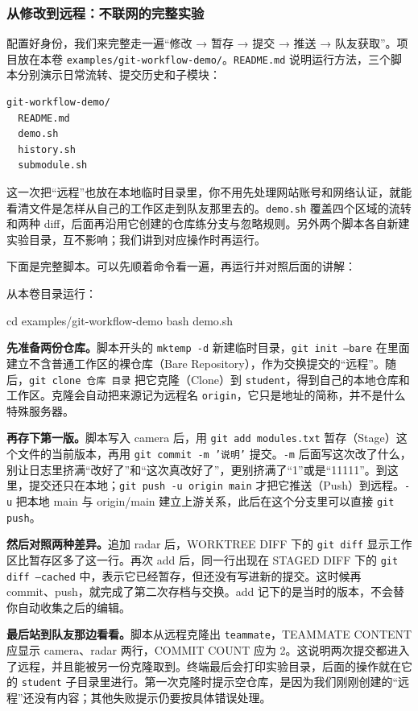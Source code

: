 \subsubsection{从修改到远程：不联网的完整实验}
\label{sec:git-local-demo}
配置好身份，我们来完整走一遍“修改 → 暂存 → 提交 → 推送 → 队友获取”。项目放在本卷 \texttt{examples/git-workflow-demo/}。\texttt{README.md} 说明运行方法，三个脚本分别演示日常流转、提交历史和子模块：
\begin{lstlisting}[language={},frame=single]
git-workflow-demo/
  README.md
  demo.sh
  history.sh
  submodule.sh
\end{lstlisting}
这一次把“远程”也放在本地临时目录里，你不用先处理网站账号和网络认证，就能看清文件是怎样从自己的工作区走到队友那里去的。\texttt{demo.sh} 覆盖四个区域的流转和两种 diff，后面再沿用它创建的仓库练分支与忽略规则。另外两个脚本各自新建实验目录，互不影响；我们讲到对应操作时再运行。
\begin{example}[两次提交与另一份克隆]
下面是完整脚本。可以先顺着命令看一遍，再运行并对照后面的讲解：



从本卷目录运行：

\begin{tbash}
cd examples/git-workflow-demo
bash demo.sh
\end{tbash}

\textbf{先准备两份仓库。}脚本开头的 \texttt{mktemp -d} 新建临时目录，\texttt{git init --bare} 在里面建立不含普通工作区的裸仓库（Bare Repository），作为交换提交的“远程”。随后，\texttt{git clone 仓库 目录} 把它克隆（Clone）到 \texttt{student}，得到自己的本地仓库和工作区。克隆会自动把来源记为远程名 \texttt{origin}，它只是地址的简称，并不是什么特殊服务器。

\textbf{再存下第一版。}脚本写入 camera 后，用 \texttt{git add modules.txt} 暂存（Stage）这个文件的当前版本，再用 \texttt{git commit -m '说明'} 提交。\texttt{-m} 后面写这次改了什么，别让日志里挤满“改好了”和“这次真改好了”，更别挤满了“1”或是“11111”。到这里，提交还只在本地；\texttt{git push -u origin main} 才把它推送（Push）到远程。\texttt{-u} 把本地 main 与 origin/main 建立上游关系，此后在这个分支里可以直接 \texttt{git push}。

\textbf{然后对照两种差异。}追加 radar 后，WORKTREE DIFF 下的 \texttt{git diff} 显示工作区比暂存区多了这一行。再次 add 后，同一行出现在 STAGED DIFF 下的 \texttt{git diff --cached} 中，表示它已经暂存，但还没有写进新的提交。这时候再 commit、push，就完成了第二次存档与交换。add 记下的是当时的版本，不会替你自动收集之后的编辑。

\textbf{最后站到队友那边看看。}脚本从远程克隆出 \texttt{teammate}，TEAMMATE CONTENT 应显示 camera、radar 两行，COMMIT COUNT 应为 2。这说明两次提交都进入了远程，并且能被另一份克隆取到。终端最后会打印实验目录，后面的操作就在它的 \texttt{student} 子目录里进行。第一次克隆时提示空仓库，是因为我们刚刚创建的“远程”还没有内容；其他失败提示仍要按具体错误处理。
\end{example}
